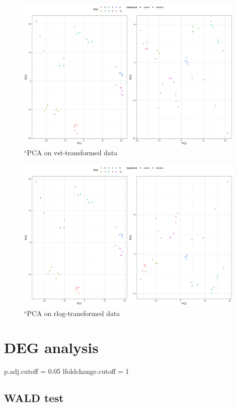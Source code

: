 \documentclass[
]{book}
\begin{document}
\begin{figure}
\centering
\includegraphics{images/pca_samples_vst.png}
\caption{``PCA on vst-transformed data}
\end{figure}

\begin{figure}
\centering
\includegraphics{images/pca_samples_rlog.png}
\caption{``PCA on rlog-transformed data}
\end{figure}

\hypertarget{deg-analysis-1}{%
\section{DEG analysis}\label{deg-analysis-1}}

p.adj.cutoff = 0.05
lfoldchange.cutoff = 1

\hypertarget{wald-test}{%
\subsection{WALD test}\label{wald-test}}
\end{document}
